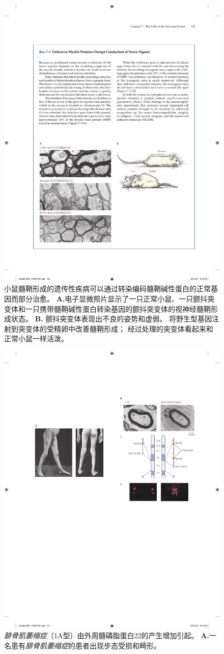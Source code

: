 \begin{figure}[htbp]
	\centering
	\includegraphics[width=1.0\linewidth]{chap07/fig_7_17}
	\caption{小鼠髓鞘形成的遗传性疾病可以通过转染编码髓鞘碱性蛋白的正常基因而部分治愈。
	\textbf{A.}电子显微照片显示了一只正常小鼠、一只颤抖突变体和一只携带髓鞘碱性蛋白转染基因的颤抖突变体的视神经髓鞘形成状态。
	\textbf{B.} 颤抖突变体表现出不良的姿势和虚弱。
	将野生型基因注射到突变体的受精卵中改善髓鞘形成；
	经过处理的突变体看起来和正常小鼠一样活泼\cite{readhead1987expression}。}
	\label{fig:7_17}
\end{figure}


\begin{figure}[htbp]
	\centering
	\includegraphics[width=0.5\linewidth]{chap07/fig_7_18}
	\caption{\textit{腓骨肌萎缩症}（1A型）由外周髓磷脂蛋白22的产生增加引起。
	\textbf{A.}一名患有\textit{腓骨肌萎缩症}的患者出现步态受损和畸形。}
	\label{fig:7_18}
\end{figure}




